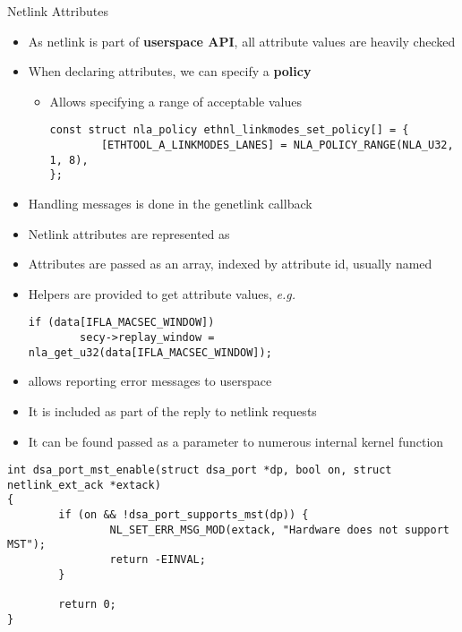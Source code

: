 \begin{frame}[fragile]{Netlink Attributes}
	\begin{itemize}
		\item As netlink is part of \textbf{userspace API}, all attribute values are heavily checked
		\item When declaring attributes, we can specify a \textbf{policy}
			\begin{itemize}
				\item Allows specifying a range of acceptable values
					\begin{verbatim}
const struct nla_policy ethnl_linkmodes_set_policy[] = {
        [ETHTOOL_A_LINKMODES_LANES] = NLA_POLICY_RANGE(NLA_U32, 1, 8),
};
					\end{verbatim}
			\end{itemize}
		\item Handling messages is done in the genetlink  callback
		\item Netlink attributes are represented as 
		\item Attributes are passed as an array, indexed by attribute id, usually named 
		\item Helpers are provided to get attribute values, \textit{e.g.} 
		\begin{verbatim}
if (data[IFLA_MACSEC_WINDOW])
        secy->replay_window = nla_get_u32(data[IFLA_MACSEC_WINDOW]);	
		\end{verbatim}
	\end{itemize}
\end{frame}

\begin{frame}[fragile]{}
	\begin{itemize}
		\item {} allows reporting error messages to userspace
		\item It is included as part of the reply to netlink requests
		\item It can be found passed as a parameter to numerous internal kernel function
	\end{itemize}
	{\fontsize{9}{10}
	\begin{verbatim}
int dsa_port_mst_enable(struct dsa_port *dp, bool on, struct netlink_ext_ack *extack)
{
        if (on && !dsa_port_supports_mst(dp)) {
                NL_SET_ERR_MSG_MOD(extack, "Hardware does not support MST");
                return -EINVAL;
        }

        return 0;
}
	\end{verbatim}
	}
\end{frame}

